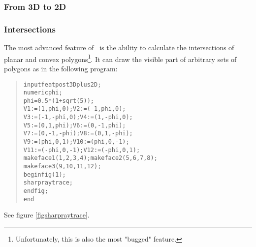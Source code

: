 
\subsubsection{From 3D to 2D}



\subsubsection{Intersections}

The most advanced feature of \FP\ is the
ability to calculate the intersections of planar and
convex polygons\footnote{Unfortunately, this is also the
most "bugged" feature.}. It can draw the visible
part of arbitrary sets of polygons as in
the following program:
\begin{quote}
\begin{alltt}
input featpost3Dplus2D;
numeric phi;
phi = 0.5*(1+sqrt(5));
V1 := ( 1, phi,0);V2 := (-1, phi,0);
V3 := (-1,-phi,0);V4 := ( 1,-phi,0);
V5 := (0, 1, phi);V6 := (0,-1, phi);
V7 := (0,-1,-phi);V8 := (0, 1,-phi);
V9 := ( phi,0, 1);V10:= ( phi,0,-1);
V11:= (-phi,0,-1);V12:= (-phi,0, 1);
makeface1(1,2,3,4);makeface2(5,6,7,8);
makeface3(9,10,11,12);
beginfig(1);
  sharpraytrace;
endfig;
end
\end{alltt}
\end{quote}
See figure \ref{figsharpraytrace}.


